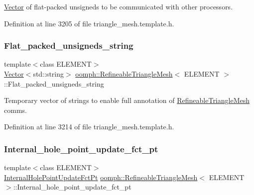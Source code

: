 \hyperlink{classoomph_1_1Vector}{Vector} of flat-\/packed unsigneds to be communicated with other processors. 



Definition at line 3205 of file triangle\+\_\+mesh.\+template.\+h.

\mbox{\label{classoomph_1_1RefineableTriangleMesh_aff72d905fab5ad211c1f7d4b77d24149}} 
\subsubsection{\texorpdfstring{Flat\+\_\+packed\+\_\+unsigneds\+\_\+string}{Flat\_packed\_unsigneds\_string}}
{\footnotesize\ttfamily template$<$class E\+L\+E\+M\+E\+NT$>$ \\
\hyperlink{classoomph_1_1Vector}{Vector}$<$std\+::string$>$ \hyperlink{classoomph_1_1RefineableTriangleMesh}{oomph\+::\+Refineable\+Triangle\+Mesh}$<$ E\+L\+E\+M\+E\+NT $>$\+::Flat\+\_\+packed\+\_\+unsigneds\+\_\+string\hspace{0.3cm}{\ttfamily [protected]}}



Temporary vector of strings to enable full annotation of \hyperlink{classoomph_1_1RefineableTriangleMesh}{Refineable\+Triangle\+Mesh} comms. 



Definition at line 3214 of file triangle\+\_\+mesh.\+template.\+h.

\mbox{\label{classoomph_1_1RefineableTriangleMesh_a64228789345c2ef62942f66058c96a5e}} 
\subsubsection{\texorpdfstring{Internal\+\_\+hole\+\_\+point\+\_\+update\+\_\+fct\+\_\+pt}{Internal\_hole\_point\_update\_fct\_pt}}
{\footnotesize\ttfamily template$<$class E\+L\+E\+M\+E\+NT$>$ \\
\hyperlink{classoomph_1_1RefineableTriangleMesh_aa6831f42aa1941f4ae0b9186d01f9d7c}{Internal\+Hole\+Point\+Update\+Fct\+Pt} \hyperlink{classoomph_1_1RefineableTriangleMesh}{oomph\+::\+Refineable\+Triangle\+Mesh}$<$ E\+L\+E\+M\+E\+NT $>$\+::Internal\+\_\+hole\+\_\+point\+\_\+update\+\_\+fct\+\_\+pt\hspace{0.3cm}{\ttfamily [protected]}}



